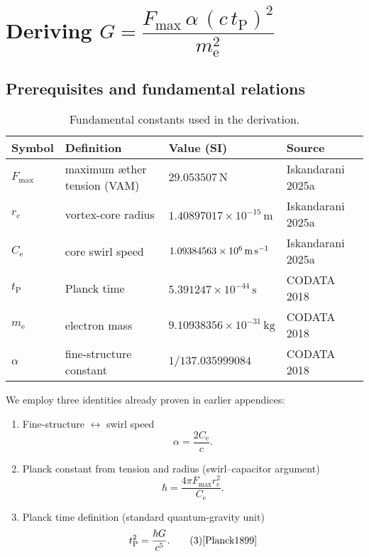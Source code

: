 

\section{Deriving $G = \dfrac{F_{\max}\,\alpha\,(c\,t_{\mathrm{P}})^{2}}{m_{\mathrm{e}}^{2}}$}

\subsection{Prerequisites and fundamental relations}

\begin{table}[h]
    \centering
    \begin{tabular}{llll}
        \toprule
        \textbf{Symbol} & \textbf{Definition} & \textbf{Value (SI)} & \textbf{Source} \\
        \midrule
        $F_{\max}$ & maximum æther tension (VAM) & $29.053507\,\text{N}$ & Iskandarani 2025a~\cite{Iskandarani2025a} \\
        $r_{\mathrm{c}}$ & vortex-core radius & $1.40897017\times10^{-15}\,\text{m}$ & Iskandarani 2025a~\cite{Iskandarani2025a} \\
        $C_{\mathrm{e}}$ & core swirl speed & $1.09384563\times10^{6}\,\text{m\,s}^{-1}$ & Iskandarani 2025a~\cite{Iskandarani2025a} \\
        $t_{\mathrm{P}}$ & Planck time & $5.391247\times10^{-44}\,\text{s}$ & CODATA 2018~\cite{CODATA2018} \\
        $m_{\mathrm{e}}$ & electron mass & $9.10938356\times10^{-31}\,\text{kg}$ & CODATA 2018~\cite{CODATA2018} \\
        $\alpha$ & fine-structure constant & $1/137.035999084$ & CODATA 2018~\cite{CODATA2018} \\
        \bottomrule
    \end{tabular}
    \caption{Fundamental constants used in the derivation.}
    \label{tab:constants}
\end{table}

We employ three identities already proven in earlier appendices:

\begin{enumerate}
    \item Fine-structure $\leftrightarrow$ swirl speed
    \begin{equation}
        \alpha = \frac{2C_{\mathrm{e}}}{c}. \tag{1}
    \end{equation}

    \item Planck constant from tension and radius (swirl–capacitor argument)
    \begin{equation}
        \hbar = \frac{4\pi F_{\max} r_{\mathrm{c}}^{2}}{C_{\mathrm{e}}}. \tag{2}
    \end{equation}

    \item Planck time definition (standard quantum-gravity unit)
    \begin{equation}
        t_{\mathrm{P}}^{2}= \frac{\hbar G}{c^{5}}. \tag{3}\hfill\text{\cite{Planck1899}}
    \end{equation}
\end{enumerate}

